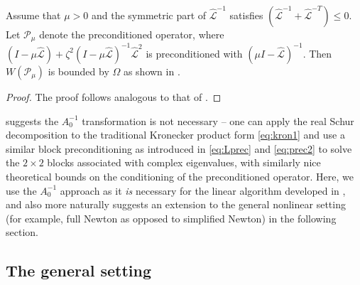 \documentclass[review]{siamart}
\begin{document}
%
\begin{corollary}\label{cor:fov}
Assume that $\mu > 0$ and the symmetric part of $\widehat{\mathcal{L}}^{-1}$
satisfies $(\widehat{\mathcal{L}}^{-1}+\widehat{\mathcal{L}}^{-T}) \leq 0$. Let
$\mathcal{P}_\mu$ denote the preconditioned operator, where
$(I - \mu \widehat{\mathcal{L}}) +
	\zeta^2(I - \mu \widehat{\mathcal{L}})^{-1}\widehat{\mathcal{L}}^2$ is
preconditioned with $(\mu I - \widehat{\mathcal{L}})^{-1}$. Then 
$W(\mathcal{P}_\mu)$ is bounded by $\Omega$ as shown in .
\end{corollary}
\begin{proof}
The proof follows analogous to that of .
\end{proof}
%

 suggests the $A_0^{-1}$ transformation is not necessary -- one
can apply the real Schur decomposition to the traditional Kronecker product form 
\eqref{eq:kron1} and use a similar block preconditioning as introduced in 
\eqref{eq:Lprec} and \eqref{eq:prec2} to solve the $2\times 2$ blocks associated
with complex eigenvalues, with similarly nice theoretical bounds on the
conditioning of the preconditioned operator. Here, we use the $A_0^{-1}$
approach as it \textit{is} necessary for the linear algorithm developed in
, and also more naturally suggests an extension to the
general nonlinear setting (for example, full Newton as opposed to simplified
Newton) in the following section.

\subsection{The general setting}\label{sec:nonlinear:gen}
\end{document}
